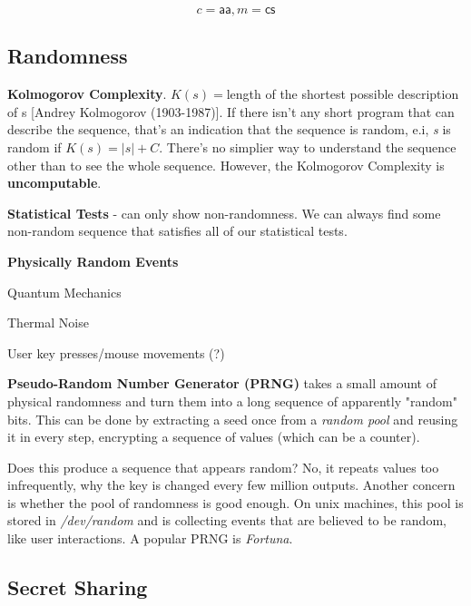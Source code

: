 \documentclass[12pt]{article}
\begin{document}
\begin{equation}
c = \mathsf{aa}, m = \mathsf{cs}
\end{equation}

\subsection*{Randomness}
\textbf{Kolmogorov Complexity}.
$K(s) = $length of the shortest possible description of s [Andrey Kolmogorov (1903-1987)]. If there isn't any short program that can describe the sequence, that's an indication that the sequence is random, e.i, \emph{s} is random if $K(s) = |s| + C$. There's no simplier way to understand the sequence other than to see the whole sequence. However, the Kolmogorov Complexity is \textbf{uncomputable}.

\textbf{Statistical Tests} - can only show non-randomness. We can always find some non-random sequence that satisfies all of our statistical tests.

\textbf{Physically Random Events}\begin{list}{*}{
\setlength{\itemsep}{0pt}
\setlength{\parsep}{0pt}
\setlength{\topsep}{0pt}
\setlength{\partopsep}{0pt}
\setlength{\leftmargin}{2em}
\setlength{\labelwidth}{1.5em}
\setlength{\labelsep}{0.5em}
}
\item Quantum Mechanics
\item Thermal Noise
\item User key presses/mouse movements (?)
\end{list}

\textbf{Pseudo-Random Number Generator (PRNG)} takes a small amount of physical randomness and turn them into a long sequence of apparently "random" bits. This can be done by extracting a seed once from a \emph{random pool} and reusing it in every step, encrypting a sequence of values (which can be a counter).

Does this produce a sequence that appears random? No, it repeats values too infrequently, why the key is changed every few million outputs. Another concern is whether the pool of randomness is good enough. On unix machines, this pool is stored in \emph{/dev/random} and is collecting events that are believed to be random, like user interactions. A popular PRNG is \emph{Fortuna}.

\subsection{Secret Sharing}
\end{document}
